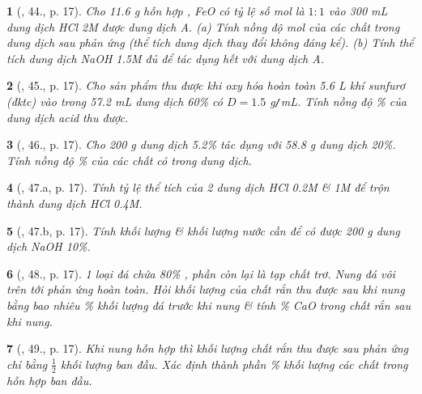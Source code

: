 \documentclass{article}
\newtheorem{baitoan}{}
\begin{document}
\begin{baitoan}[\cite{An_400_BT_Hoa_Hoc_9}, 44., p. 17]
	Cho {\rm11.6 g} hỗn hợp {\rm{}, FeO} có tỷ lệ số mol là $1:1$ vào {\rm300 mL} dung dịch {\rm HCl 2M} được dung dịch A. (a) Tính nồng độ mol của các chất trong dung dịch sau phản ứng (thể tích dung dịch thay đổi không đáng kể). (b) Tính thể tích dung dịch {\rm NaOH 1.5M} đủ để tác dụng hết với dung dịch A.
\end{baitoan}

\begin{baitoan}[\cite{An_400_BT_Hoa_Hoc_9}, 45., p. 17]
	Cho sản phẩm thu được khi oxy hóa hoàn toàn {\rm5.6 L} khí sunfurơ (đktc) vào trong {\rm57.2 mL} dung dịch {\rm{} 60\%} có $D = 1.5$ {\rm g{\tt/}mL}. Tính nồng độ {\rm\%} của dung dịch acid thu được.
\end{baitoan}

\begin{baitoan}[\cite{An_400_BT_Hoa_Hoc_9}, 46., p. 17]
	Cho {\rm200 g} dung dịch {\rm{} 5.2\%} tác dụng với {\rm58.8 g} dung dịch {\rm{} 20\%}. Tính nồng độ {\rm\%} của các chất có trong dung dịch.
\end{baitoan}

\begin{baitoan}[\cite{An_400_BT_Hoa_Hoc_9}, 47.a, p. 17]
	Tính tỷ lệ thể tích của 2 dung dịch {\rm HCl 0.2M \& 1M} để trộn thành dung dịch {\rm HCl 0.4M}.
\end{baitoan}

\begin{baitoan}[\cite{An_400_BT_Hoa_Hoc_9}, 47.b, p. 17]
	Tính khối lượng {\rm{}} \& khối lượng nước cần để có được {\rm200 g} dung dịch {\rm NaOH 10\%}.
\end{baitoan}

\begin{baitoan}[\cite{An_400_BT_Hoa_Hoc_9}, 48., p. 17]
	1 loại đá chứa {\rm80\% }, phần còn lại là tạp chất trơ. Nung đá vôi trên tới phản ứng hoàn toàn. Hỏi khối lượng của chất rắn thu được sau khi nung bằng bao nhiêu {\rm\%} khối lượng đá trước khi nung \& tính {\rm\% CaO} trong chất rắn sau khi nung.
\end{baitoan}

\begin{baitoan}[\cite{An_400_BT_Hoa_Hoc_9}, 49., p. 17]
	Khi nung hỗn hợp {\rm{}} thì khối lượng chất rắn thu được sau phản ứng chỉ bằng $\frac{1}{2}$ khối lượng ban đầu. Xác định thành phần {\rm\%} khối lượng các chất trong hỗn hợp ban đầu.
\end{baitoan}
\end{document}
